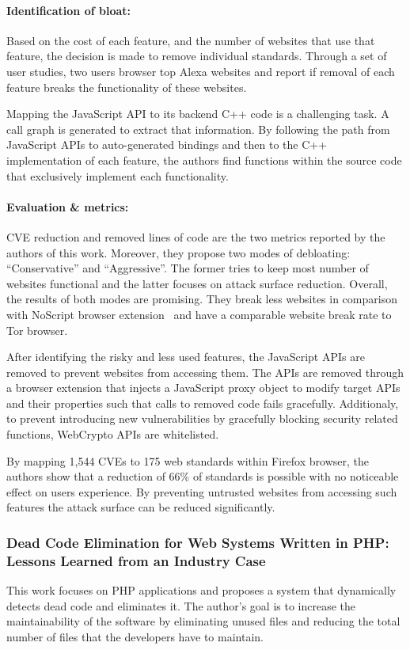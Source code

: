 \paragraph{Identification of bloat:} Based on the cost of each feature, and the number of websites that use that feature, the decision is made to remove individual standards. Through a set of user studies, two users browser top Alexa websites and report if removal of each feature breaks the functionality of these websites.

Mapping the JavaScript API to its backend C++ code is a challenging task. A call graph is generated to extract that information. By following the path from JavaScript APIs to auto-generated bindings and then to the C++ implementation of each feature, the authors find functions within the source code that exclusively implement each functionality.
\paragraph{Evaluation \& metrics:} CVE reduction and removed lines of code are the two metrics reported by the authors of this work. Moreover, they propose two modes of debloating: ``Conservative'' and ``Aggressive''. The former tries to keep most number of websites functional and the latter focuses on attack surface reduction. Overall, the results of both modes are promising. They break less websites in comparison with NoScript browser extension~\cite{noscript} and have a comparable website break rate to Tor browser.

After identifying the risky and less used features, the JavaScript APIs are removed to prevent websites from accessing them. The APIs are removed through a browser extension that injects a JavaScript proxy object to modify target APIs and their properties such that
calls to removed code fails gracefully. Additionaly, to prevent introducing new vulnerabilities by gracefully blocking security related functions, WebCrypto APIs are whitelisted.


By mapping 1,544 CVEs to 175 web standards within Firefox browser, the authors show that a reduction of 66\% of standards is possible with no noticeable effect on users experience. By preventing untrusted websites from accessing such features the attack surface can be reduced significantly.

\subsubsection{Dead Code Elimination for Web Systems Written in PHP: Lessons Learned from an Industry Case}
This work focuses on PHP applications and proposes a system that dynamically detects dead code and eliminates it. The author's goal is to increase the maintainability of the software by eliminating unused files and reducing the total number of files that the developers have to maintain.
